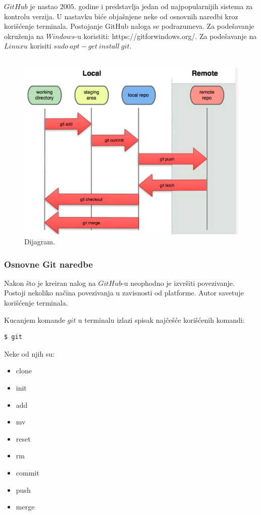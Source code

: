 $GitHub$ je nastao $2005.$ godine i predstavlja jedan od najpopularnijih sistema za kontrolu verzija. U nastavku biće objašnjene neke od osnovnih naredbi kroz korišćenje terminala. Postojanje GitHub naloga se podrazumeva. Za podešavanje okruženja na $Windows$-u koristiti: https://gitforwindows.org/. Za podešavanje na $Linuxu$ korisiti $sudo\ apt-get\ install\ git$.\\\\

\begin{figure}[h!]
\begin{center}
\includegraphics[scale=0.5]{pictures/git_diag.png}
\end{center}
\caption{Dijagram.}
\label{fig:storage}
\end{figure}

\subsubsection{Osnovne Git naredbe}
Nakon što je kreiran nalog na $GitHub$-u neophodno je izvršiti povezivanje. Postoji nekoliko načina povezivanja u zavisnosti od platforme. Autor savetuje korišćenje terminala.

Kucanjem komande $git$ u terminalu izlazi spisak najčešće korišćenih komandi:
\begin{verbatim}
$ git 
\end{verbatim}

Neke od njih su:
\begin{itemize}
\item clone
\item init
\item add
\item mv
\item reset
\item rm
\item commit 
\item push
\item merge
\end{itemize}

